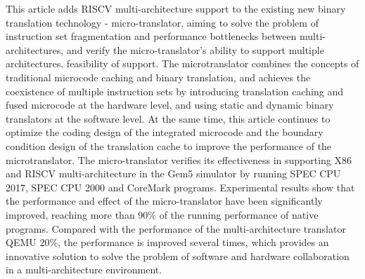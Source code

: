 This article adds RISCV multi-architecture support to the existing new binary translation technology - micro-translator, aiming to solve the problem of instruction set fragmentation and performance bottlenecks between multi-architectures, and verify the micro-translator's ability to support multiple architectures. feasibility of support.
The microtranslator combines the concepts of traditional microcode caching and binary translation, and achieves the coexistence of multiple instruction sets by introducing translation caching and fused microcode at the hardware level, and using static and dynamic binary translators at the software level.
At the same time, this article continues to optimize the coding design of the integrated microcode and the boundary condition design of the translation cache to improve the performance of the microtranslator.
The micro-translator verifies its effectiveness in supporting X86 and RISCV multi-architecture in the Gem5 simulator by running SPEC CPU 2017, SPEC CPU 2000 and CoreMark programs.
Experimental results show that the performance and effect of the micro-translator have been significantly improved, reaching more than 90\% of the running performance of native programs.
Compared with the performance of the multi-architecture translator QEMU 20\%, the performance is improved several times, which provides an innovative solution to solve the problem of software and hardware collaboration in a multi-architecture environment.


